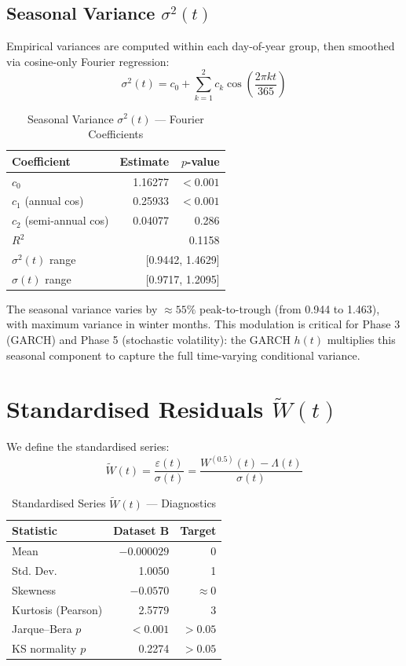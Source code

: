 \documentclass[11pt]{article}
\begin{document}
\subsection{Seasonal Variance $\sigma^2(t)$}

Empirical variances are computed within each day-of-year group, then smoothed via cosine-only Fourier regression:
$$\sigma^2(t) = c_0 + \sum_{k=1}^{2} c_k \cos\left(\frac{2\pi k t}{365}\right)$$

\begin{table}[h]
\centering
\caption{Seasonal Variance $\sigma^2(t)$ --- Fourier Coefficients}
\label{tab:fourier_var}
\begin{tabular}{lrr}
\toprule
\textbf{Coefficient} & \textbf{Estimate} & \textbf{$p$-value} \\
\midrule
$c_0$ & 1.16277 & $<0.001$ \\
$c_1$ (annual cos) & 0.25933 & $<0.001$ \\
$c_2$ (semi-annual cos) & 0.04077 & 0.286 \\
\midrule
$R^2$ & \multicolumn{2}{r}{0.1158} \\
\midrule
$\sigma^2(t)$ range & \multicolumn{2}{r}{[0.9442, 1.4629]} \\
$\sigma(t)$ range & \multicolumn{2}{r}{[0.9717, 1.2095]} \\
\bottomrule
\end{tabular}
\end{table}

The seasonal variance varies by $\approx 55\%$ peak-to-trough (from 0.944 to 1.463), with maximum variance in winter months. This modulation is critical for Phase 3 (GARCH) and Phase 5 (stochastic volatility): the GARCH $h(t)$ multiplies this seasonal component to capture the full time-varying conditional variance.

\section{Standardised Residuals $\widetilde{W}(t)$}

We define the standardised series:
$$\widetilde{W}(t) = \frac{\varepsilon(t)}{\sigma(t)} = \frac{W^{(0.5)}(t) - \Lambda(t)}{\sigma(t)}$$

\begin{table}[h]
\centering
\caption{Standardised Series $\widetilde{W}(t)$ --- Diagnostics}
\label{tab:wtilde_stats}
\begin{tabular}{lrr}
\toprule
\textbf{Statistic} & \textbf{Dataset B} & \textbf{Target} \\
\midrule
Mean & $-0.000029$ & 0 \\
Std. Dev. & 1.0050 & 1 \\
Skewness & $-0.0570$ & $\approx 0$ \\
Kurtosis (Pearson) & 2.5779 & 3 \\
Jarque--Bera $p$ & $<0.001$ & $>0.05$ \\
KS normality $p$ & 0.2274 & $>0.05$ \\
\bottomrule
\end{tabular}
\end{table}
\end{document}
